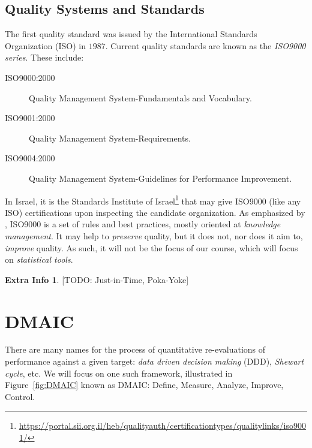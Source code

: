 \documentclass[12pt,a4paper]{report}
\theoremstyle{plain}
\theoremstyle{definition}
\newtheorem{extra}{Extra Info}
\begin{document}
\subsection{Quality Systems and Standards}
The first quality standard was issued by the International Standards Organization (ISO) in $1987$.
Current quality standards are known as the \emph{ISO9000 series}. These include:
\begin{description}
\item [ISO9000:2000] Quality Management System-Fundamentals and Vocabulary.
\item [ISO9001:2000] Quality Management System-Requirements.
\item [ISO9004:2000] Quality Management System-Guidelines for Performance Improvement.
\end{description}
In Israel, it is the Standards Institute of Israel\footnote{\url{https://portal.sii.org.il/heb/qualityauth/certificationtypes/qualitylinks/iso9001/}} that may give ISO9000 (like any ISO) certifications upon inspecting the candidate organization.
As emphasized by \citet[p.24]{montgomery_introduction_2007}, ISO9000 is a set of rules and best practices, mostly oriented at \emph{knowledge management}. 
It may help to \emph{preserve} quality, but it does not, nor does it aim to, \emph{improve} quality.
As such, it will not be the focus of our course, which will focus on \emph{statistical tools}.


\begin{extra}

[TODO: Just-in-Time, Poka-Yoke]

\end{extra}




\section{DMAIC}
There are many names for the process of quantitative re-evaluations of performance against a given target: \emph{data driven decision making} (DDD), \emph{Shewart cycle}, etc.
We will focus on one such framework, illustrated in Figure~\ref{fig:DMAIC} known as DMAIC: Define, Measure, Analyze, Improve, Control.
\end{document}
